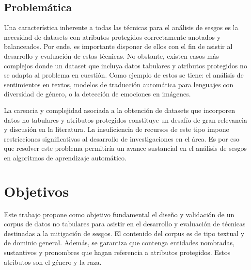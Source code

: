 
\subsection*{Problem\'atica}
Una caracter\'istica inherente a todas las t\'ecnicas para el an\'alisis de sesgos es la necesidad de datasets con 
atributos protegidos correctamente anotados y balanceados. Por ende, es importante disponer de ellos con el fin de 
asistir al desarrollo y evaluaci\'on de estas t\'ecnicas. No obstante, existen casos m\'as complejos donde un dataset que incluya 
datos tabulares y atributos protegidos no se adapta al problema en cuesti\'on. Como ejemplo de estos se tiene:  
el an\'alisis de sentimientos en textos, modelos de traducci\'on autom\'atica para lenguajes con diversidad 
de g\'enero, o la detecci\'on de emociones en im\'agenes.

La carencia y complejidad asociada a la obtenci\'on de datasets que incorporen datos no tabulares y atributos protegidos constituye un 
desaf\'io de gran relevancia y discusi\'on en la literatura. La insuficiencia de recursos de este tipo impone restricciones 
significativas al desarrollo de investigaciones en el \'area. Es por eso que resolver este problema permitir\'ia un avance sustancial 
en el an\'alisis de sesgos en algoritmos de aprendizaje autom\'atico.

\section*{Objetivos}
Este trabajo propone como objetivo fundamental el dise\~no y validaci\'on de un corpus de datos no tabulares para
asistir en el desarrollo y evaluaci\'on de t\'ecnicas destinadas a la mitigaci\'on de sesgos. El contenido del corpus
es de tipo textual y de dominio general. Adem\'as, se garantiza que contenga entidades nombradas, sustantivos y pronombres
que hagan referencia a atributos protegidos. Estos atributos son el g\'enero y la raza.


